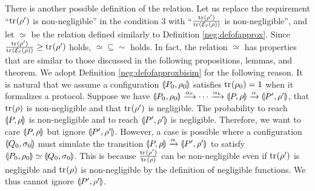 There is another possible definition of the relation.
Let us replace the requirement ``${\rm tr}_{}(\rho')$ is non-negligible'' in the condition
3 with ``$\frac{{\rm tr}_{}(\rho')}{{\rm tr}_{}(\mathcal{E}_{\tilde r}(\rho))}$ is non-negligible'', and
let $\simeq$ be the relation defined similarly to
Definition \ref{neg:defofapprox}.
Since $\frac{{\rm tr}_{}(\rho')}{{\rm tr}_{}(\mathcal{E}_{\tilde r}(\rho))} \ge
{\rm tr}_{}(\rho')$ holds, $\simeq \subseteq \sim$
holds. In fact, the relation $\simeq$
has properties that are similar to those discussed in the following
propositions, lemmas, and theorem.
We adopt Definition \ref{neg:defofapproxbisim} for the following reason.
It is natural that we assume a configuration $\llparenthesis P_0, \rho_0 \rrparenthesis$ satisfies
${\rm tr}_{}(\rho_0) = 1$ when it formalizes a protocol.
Suppose we have $\llparenthesis P_0, \rho_0 \rrparenthesis \xrightarrow{\alpha_0} \cdots
\xrightarrow{\alpha_k} \llparenthesis P, \rho \rrparenthesis \xrightarrow{\alpha}
\llparenthesis P', \rho' \rrparenthesis$, that ${\rm tr}_{}(\rho)$ is non-negligible and
that ${\rm tr}_{}(\rho')$ is negligible. The probability to reach
$\llparenthesis P, \rho \rrparenthesis$ is non-negligible and to reach $\llparenthesis P', \rho' \rrparenthesis$ is
negligible.
Therefore, we want to care $\llparenthesis P, \rho \rrparenthesis$ but ignore $\llparenthesis P', \rho' \rrparenthesis$.
However, a case is possible where a configuration $\llparenthesis Q_0, \sigma_0 \rrparenthesis$
must simulate the transition $\llparenthesis P, \rho \rrparenthesis \xrightarrow{\alpha}
\llparenthesis P', \rho' \rrparenthesis$ to satisfy $\llparenthesis P_0, \rho_0 \rrparenthesis \simeq
\llparenthesis Q_0, \sigma_0 \rrparenthesis$. This is because $\frac{{\rm tr}_{}(\rho')}{{\rm tr}_{}(\rho)}$
can be non-negligible even if ${\rm tr}_{}(\rho')$ is negligible and
${\rm tr}_{}(\rho)$ is non-negligible by the definition of negligible
functions. We thus cannot ignore $\llparenthesis P', \rho' \rrparenthesis$.

